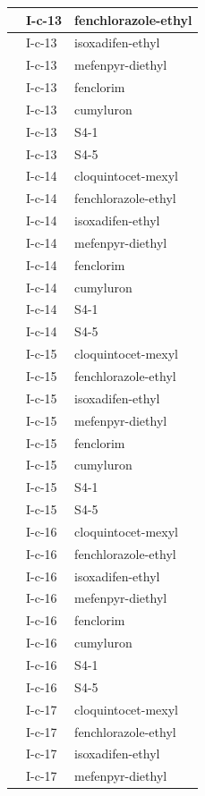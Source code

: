 \documentclass[11pt,a4paper]{article}
\begin{document}
\begin{table}[h]
\begin{tabular}{|l|l|l|}
 & I-c-13 & fenchlorazole-ethyl \\ \hline
 & I-c-13 & isoxadifen-ethyl \\ \hline
 & I-c-13 & mefenpyr-diethyl \\ \hline
 & I-c-13 & fenclorim \\ \hline
 & I-c-13 & cumyluron \\ \hline
 & I-c-13 & S4-1 \\ \hline
 & I-c-13 & S4-5 \\ \hline
 & I-c-14 & cloquintocet-mexyl \\ \hline
 & I-c-14 & fenchlorazole-ethyl \\ \hline
 & I-c-14 & isoxadifen-ethyl \\ \hline
 & I-c-14 & mefenpyr-diethyl \\ \hline
 & I-c-14 & fenclorim \\ \hline
 & I-c-14 & cumyluron \\ \hline
 & I-c-14 & S4-1 \\ \hline
 & I-c-14 & S4-5 \\ \hline
 & I-c-15 & cloquintocet-mexyl \\ \hline
 & I-c-15 & fenchlorazole-ethyl \\ \hline
 & I-c-15 & isoxadifen-ethyl \\ \hline
 & I-c-15 & mefenpyr-diethyl \\ \hline
 & I-c-15 & fenclorim \\ \hline
 & I-c-15 & cumyluron \\ \hline
 & I-c-15 & S4-1 \\ \hline
 & I-c-15 & S4-5 \\ \hline
 & I-c-16 & cloquintocet-mexyl \\ \hline
 & I-c-16 & fenchlorazole-ethyl \\ \hline
 & I-c-16 & isoxadifen-ethyl \\ \hline
 & I-c-16 & mefenpyr-diethyl \\ \hline
 & I-c-16 & fenclorim \\ \hline
 & I-c-16 & cumyluron \\ \hline
 & I-c-16 & S4-1 \\ \hline
 & I-c-16 & S4-5 \\ \hline
 & I-c-17 & cloquintocet-mexyl \\ \hline
 & I-c-17 & fenchlorazole-ethyl \\ \hline
 & I-c-17 & isoxadifen-ethyl \\ \hline
 & I-c-17 & mefenpyr-diethyl \\ \hline

\end{tabular}
\end{table}
\end{document}
